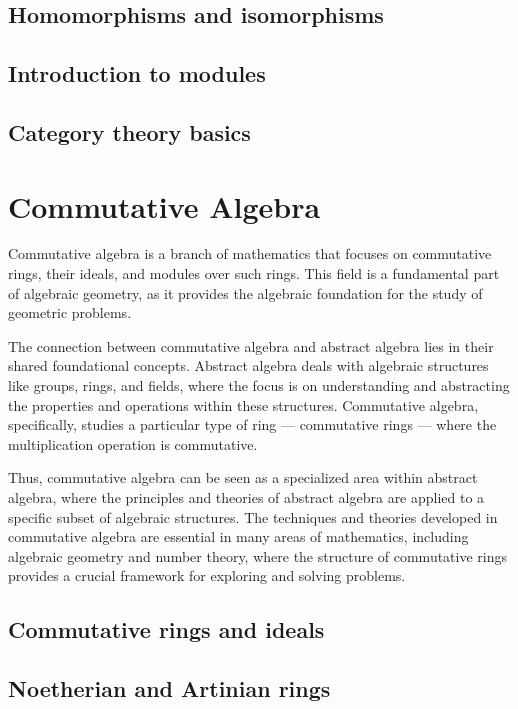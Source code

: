 \documentclass{article}
\begin{document}
\subsection{Homomorphisms and isomorphisms}
\subsection{Introduction to modules}
\subsection{Category theory basics}









\clearpage
\section{Commutative Algebra}

	Commutative algebra is a branch of mathematics that focuses on commutative rings, their ideals, and modules over such rings. This field is a fundamental part of algebraic geometry, as it provides the algebraic foundation for the study of geometric problems.

The connection between commutative algebra and abstract algebra lies in their shared foundational concepts. Abstract algebra deals with algebraic structures like groups, rings, and fields, where the focus is on understanding and abstracting the properties and operations within these structures. Commutative algebra, specifically, studies a particular type of ring --- commutative rings --- where the multiplication operation is commutative.

Thus, commutative algebra can be seen as a specialized area within abstract algebra, where the principles and theories of abstract algebra are applied to a specific subset of algebraic structures. The techniques and theories developed in commutative algebra are essential in many areas of mathematics, including algebraic geometry and number theory, where the structure of commutative rings provides a crucial framework for exploring and solving problems.


\subsection{Commutative rings and ideals}
\subsection{Noetherian and Artinian rings}
\end{document}
